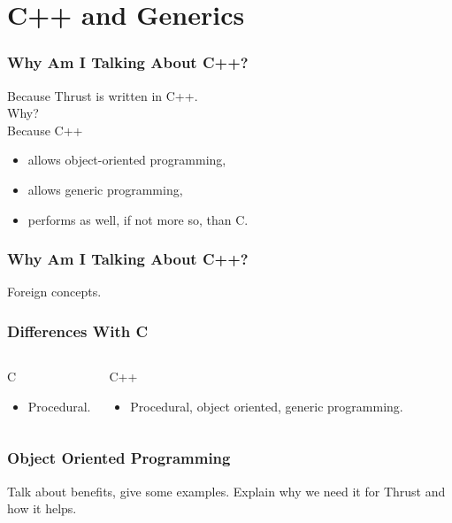 \documentclass{beamer}
\begin{document}
\section{C++ and Generics}

\begin{frame}
  \frametitle{Why Am I Talking About C++?}
  Because Thrust is written in C++. \\
  \vspace{.2cm}
  \hspace{.5cm}Why? \\
  \vspace{.2cm}
  \hspace{1cm}Because C++
  \vspace{.1cm}
  \begin{itemize}
    \item allows object-oriented programming,
    \item allows generic programming,
    \item performs as well, if not more so, than C.
  \end{itemize}
\end{frame}

\begin{frame}
  \frametitle{Why Am I Talking About C++?}
  Foreign concepts.
\end{frame}

\begin{frame}
  \frametitle{Differences With C}
  \begin{columns}
    \begin{block}{C}
    \begin{itemize}
    \item Procedural.
    \end{itemize}
    \end{block}

    \begin{block}{C++}
    \begin{itemize}
    \item Procedural, object oriented, generic programming.
    \end{itemize}
    \end{block}
  \end{columns}
\end{frame}

\begin{frame}
  \frametitle{Object Oriented Programming}
  Talk about benefits, give some examples. Explain why
  we need it for Thrust and how it helps.
\end{frame}
\end{document}

